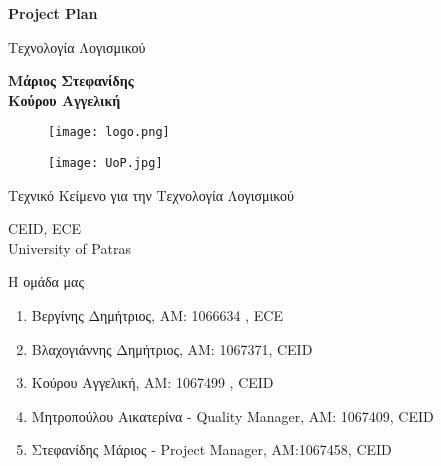 \documentclass{article}
\begin{document}

\begin{titlepage}
   \begin{center}
       \vspace*{1cm}

       \textbf{\huge Project Plan}

       \vspace{0.5cm}
        Τεχνολογία Λογισμικού
            
       \vspace{1cm}

       \textbf{Μάριος Στεφανίδης\\Κούρου Αγγελική}
       
       
       \begin{figure}[!htb]
        \centering
        \texttt{[image: logo.png]}
        \end{figure}
        
        \vspace{0.5cm}
        
        \begin{figure}[!htb]
        \centering
        \texttt{[image: UoP.jpg]}
        \end{figure}


       \vfill
            
       Τεχνικό Κείμενο για την Τεχνολογία Λογισμικού\\
            
       \vspace{0.5cm}
            
       CEID, ECE\\
       University of Patras\\
            
   \end{center}
\end{titlepage}



\noindent Η ομάδα μας

\begin{enumerate}
  \item Βεργίνης Δημήτριος, ΑΜ: 1066634 , ECE
  \item Βλαχογιάννης Δημήτριος, ΑΜ: 1067371, CEID
  \item Κούρου Αγγελική, ΑΜ: 1067499 , CEID
  \item Μητροπούλου Αικατερίνα - Quality Manager, ΑΜ: 1067409, CEID
  \item Στεφανίδης Μάριος - Project Manager, ΑΜ:1067458, CEID
\end{enumerate}
\end{document}
